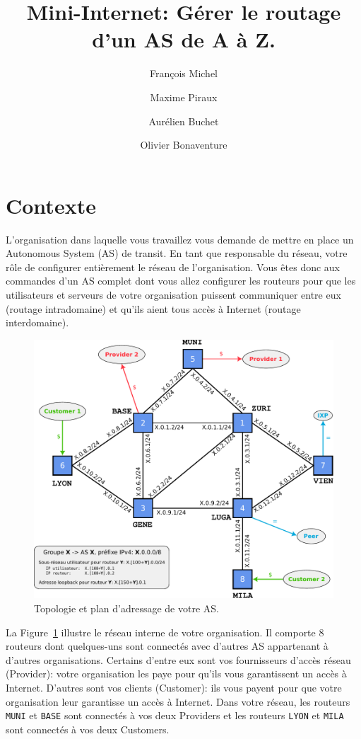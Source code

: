 \documentclass[a4paper, 11pt]{article}
\title{Mini-Internet: Gérer le routage d'un AS de A à Z.}
\author{François Michel \and Maxime Piraux \and Aurélien Buchet \and Olivier Bonaventure}
\begin{document}
\maketitle
\tableofcontents

\section{Contexte}

L'organisation dans laquelle vous travaillez vous demande
de mettre en place un Autonomous System (AS) de transit.
En tant que responsable du réseau, votre rôle
de configurer entièrement le réseau de l'organisation.
Vous êtes donc aux commandes d'un AS complet
dont vous allez configurer les routeurs pour que les utilisateurs
et serveurs de votre organisation puissent communiquer entre eux
(routage intradomaine) et qu'ils aient tous accès à Internet
(routage interdomaine).

\begin{figure}
    \includegraphics[width=\linewidth]{figures/topo}
    \caption{Topologie et plan d'adressage de votre AS.}
    \label{fig:topo}
\end{figure}

La Figure~\ref{fig:topo} illustre le réseau interne de votre organisation.
Il comporte 8 routeurs dont quelques-uns sont connectés avec d'autres AS
appartenant à d'autres organisations. Certains d'entre eux sont
vos fournisseurs d'accès réseau (Provider): votre organisation
les paye pour qu'ils vous garantissent un accès à Internet.
D'autres sont vos clients (Customer): ils vous payent pour que
votre organisation leur garantisse un accès à Internet.   
Dans votre réseau, les routeurs \texttt{MUNI} et \texttt{BASE}
sont connectés à vos deux Providers et les routeurs \texttt{LYON}
et \texttt{MILA} sont connectés à vos deux Customers.
\end{document}
